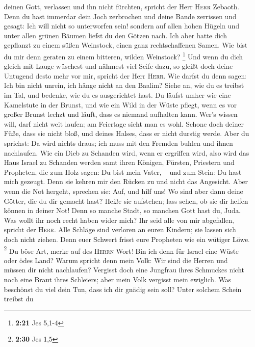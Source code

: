 deinen Gott, verlassen und ihn nicht fürchten, spricht der Herr
\textsc{Herr} Zebaoth.  Denn du hast immerdar dein Joch
zerbrochen und deine Bande zerrissen und gesagt: Ich will nicht so
unterworfen sein! sondern auf allen hohen Hügeln und unter allen grünen
Bäumen liefst du den Götzen nach.  Ich aber hatte dich
gepflanzt zu einem süßen Weinstock, einen ganz rechtschaffenen Samen.
Wie bist du mir denn geraten zu einem bitteren, wilden Weinstock?
\footnote{\textbf{2:21} Jes 5,1-4}  Und wenn du dich
gleich mit Lauge wüschest und nähmest viel Seife dazu, so gleißt doch
deine Untugend desto mehr vor mir, spricht der Herr \textsc{Herr}.
 Wie darfst du denn sagen: Ich bin nicht unrein, ich
hänge nicht an den Baalim? Siehe an, wie du es treibst im Tal, und
bedenke, wie du es ausgerichtet hast.  Du läufst umher
wie eine Kamelstute in der Brunst, und wie ein Wild in der Wüste pflegt,
wenn es vor großer Brunst lechzt und läuft, dass es niemand aufhalten
kann. Wer's wissen will, darf nicht weit laufen; am Feiertage sieht man
es wohl.  Schone doch deiner Füße, dass sie nicht bloß,
und deines Halses, dass er nicht durstig werde. Aber du sprichst: Da
wird nichts draus; ich muss mit den Fremden buhlen und ihnen nachlaufen.
 Wie ein Dieb zu Schanden wird, wenn er ergriffen wird,
also wird das Haus Israel zu Schanden werden samt ihren Königen,
Fürsten, Priestern und Propheten,  die zum Holz sagen: Du
bist mein Vater, -- und zum Stein: Du hast mich gezeugt. Denn sie kehren
mir den Rücken zu und nicht das Angesicht. Aber wenn die Not hergeht,
sprechen sie: Auf, und hilf uns!  Wo sind aber dann deine
Götter, die du dir gemacht hast? Heiße sie aufstehen; lass sehen, ob sie
dir helfen können in deiner Not! Denn so manche Stadt, so manchen Gott
hast du, Juda.  Was wollt ihr noch recht haben wider
mich? Ihr seid alle von mir abgefallen, spricht der \textsc{Herr}.
 Alle Schläge sind verloren an euren Kindern; sie lassen
sich doch nicht ziehen. Denn euer Schwert frisst eure Propheten wie ein
wütiger Löwe. \footnote{\textbf{2:30} Jes 1,5}  Du böse
Art, merke auf des \textsc{Herrn} Wort! Bin ich denn für Israel eine
Wüste oder ödes Land? Warum spricht denn mein Volk: Wir sind die Herren
und müssen dir nicht nachlaufen?  Vergisst doch eine
Jungfrau ihres Schmuckes nicht noch eine Braut ihres Schleiers; aber
mein Volk vergisst mein ewiglich.  Was beschönst du viel
dein Tun, dass ich dir gnädig sein soll? Unter solchem Schein treibst du
